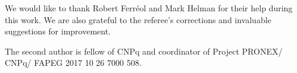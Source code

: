 We would like to thank Robert Ferréol and Mark Helman for their help during this work. We are also grateful to the referee's corrections and invaluable suggestions for improvement.

The second author is fellow of CNPq and coordinator of Project PRONEX/ CNPq/ FAPEG 2017 10 26 7000 508.